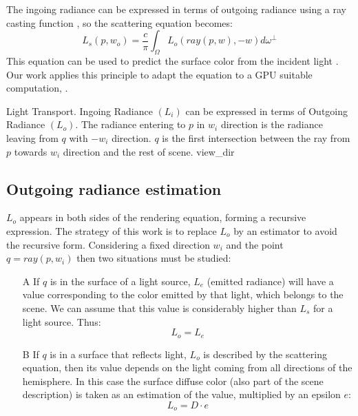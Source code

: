 \documentclass[10pt, conference]{IEEEtran}
\begin{document}
The ingoing radiance can be expressed in terms of outgoing radiance using a ray casting function \cite[p.~90]{monte_carlo_light_transport}, so the scattering equation becomes:
\[
	L_s(p,w_o) = \frac{c}{\pi }\int_ \Omega L_o(ray(p,w), -w)d\omega^\perp
\]
This equation can be used to predict the surface color from the incident light \cite[p.~86]{monte_carlo_light_transport}. 
Our work applies this principle to adapt the equation to a GPU suitable computation, .

\subimages
	{Light Transport. Ingoing Radiance $(L_i)$ can be expressed in terms of Outgoing Radiance $(L_o)$.
		The radiance entering to $p$ in $w_i$ direction is the radiance leaving from $q$ with $-w_i$ direction. 
		$q$ is the first intersection between the ray from $p$ towards $w_i$ direction and the rest of scene.}
	{view_dir}{
}

\subsection{Outgoing radiance estimation}
%
$L_o$ appears in both sides of the rendering equation, forming a recursive expression. The strategy of this work is to replace $L_o$ by an estimator to avoid the recursive form. 
Considering a fixed direction $w_i$ and the point $q = ray(p, w_i)$ then two situations must be studied:

\begin{itemize}
	\item[A] If $q$ is in the surface of a light source, $L_e$ (emitted radiance) will have a value corresponding to the color emitted by that light, which belongs to the scene. We can assume that this value is considerably higher than $L_s$ for a light source. Thus:
		\begin{equation}
			\label{eq_radiance_case_A}
			L_o = L_e 
		\end{equation}
	\item[B] If $q$ is in a surface that reflects light, $L_o$ is described by the scattering equation, then its value depends on the light coming from all directions of the hemisphere. In this case the surface diffuse color (also part of the scene description) is taken as an estimation of the value, multiplied by an epsilon $e$:
		\begin{equation}
			\label{eq_radiance_case_B}
			L_o = D \cdotp e 
		\end{equation}
\end{itemize}
\end{document}
